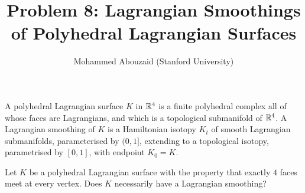

\title{Problem 8: Lagrangian Smoothings of Polyhedral Lagrangian Surfaces}
\author{Mohammed Abouzaid (Stanford University)}
\date{}


\maketitle

A polyhedral Lagrangian surface $K$ in $\mathbb{R}^4$ is a finite polyhedral complex all of whose faces are Lagrangians, and which is a topological submanifold of $\mathbb{R}^4$. A Lagrangian smoothing of $K$ is a Hamiltonian isotopy $K_t$ of smooth Lagrangian submanifolds, parameterised by $(0,1]$, extending to a topological isotopy, parametrised by $[0,1]$, with endpoint $K_0 = K$.

Let $K$ be a polyhedral Lagrangian surface with the property that exactly $4$ faces meet at every vertex. Does $K$ necessarily have a Lagrangian smoothing?


